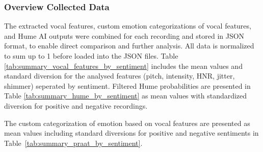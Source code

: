 \subsubsection{Overview Collected Data}
The extracted vocal features, custom emotion categorizations of vocal features, and Hume AI outputs were combined for each recording and stored in JSON format, to enable direct comparison and further analysis. All data is normalized to sum up to 1 before loaded into the JSON files. 
Table \ref{tab:summary_vocal_features_by_sentiment} includes the mean values and standard diversion for the analysed features (pitch, intensity, HNR, jitter, shimmer) seperated by sentiment. 
Filtered Hume probabilities are presented in Table \ref{tab:summary_hume_by_sentiment} as mean values with standardized diversion for positive and negative recordings.

The custom categorization of emotion based on vocal features are presented as mean values including standard diversions for positive and negative sentiments in Table~\ref{tab:summary_praat_by_sentiment}. 

